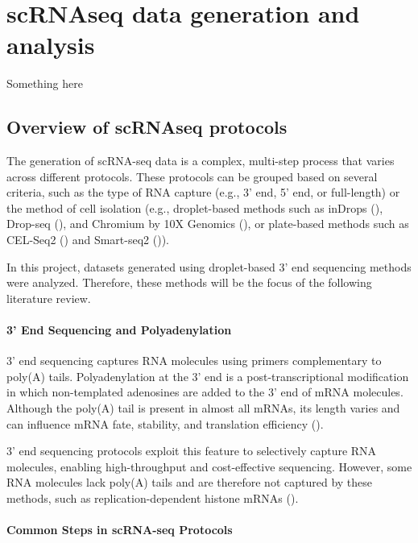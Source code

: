 \section{scRNAseq data generation and analysis}

Something here

\subsection{Overview of scRNAseq protocols}

The generation of scRNA-seq data is a complex, multi-step process that varies across different protocols.
These protocols can be grouped based on several criteria, such as the type of RNA capture
(e.g., 3' end, 5' end, or full-length) or the method of cell isolation
(e.g., droplet-based methods such as inDrops (\cite{Klein2015}), Drop-seq (\cite{Macosko2015}),
and Chromium by 10X Genomics (\cite{Zheng2017}),
or plate-based methods such as CEL-Seq2 (\cite{Hashimshony2016}) and Smart-seq2 (\cite{Picelli2013})).

In this project, datasets generated using droplet-based 3' end sequencing methods were analyzed.
Therefore, these methods will be the focus of the following literature review.

\paragraph{3' End Sequencing and Polyadenylation}

3' end sequencing captures RNA molecules using primers complementary to poly(A) tails.
Polyadenylation at the 3' end is a post-transcriptional modification
in which non-templated adenosines are added to the 3' end of mRNA molecules.
Although the poly(A) tail is present in almost all mRNAs,
its length varies and can influence mRNA fate, stability, and translation efficiency (\cite{Brouze2022}).

3' end sequencing protocols exploit this feature to selectively capture RNA molecules,
enabling high-throughput and cost-effective sequencing.
However, some RNA molecules lack poly(A) tails and are therefore not captured by these methods,
such as replication-dependent histone mRNAs (\cite{Brouze2022}).

\paragraph{Common Steps in scRNA-seq Protocols}

